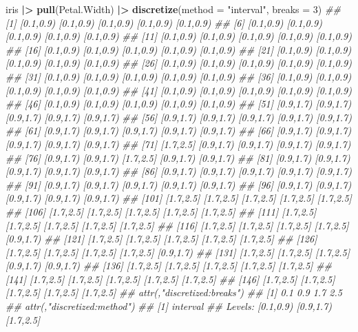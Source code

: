 \documentclass[
  notitlepage]{book}
\newenvironment{Shaded}{\begin{snugshade}}{\end{snugshade}}
\newcommand{\CommentTok}[1]{\textcolor[rgb]{0.56,0.35,0.01}{\textit{#1}}}
\newcommand{\DataTypeTok}[1]{\textcolor[rgb]{0.13,0.29,0.53}{#1}}
\newcommand{\DecValTok}[1]{\textcolor[rgb]{0.00,0.00,0.81}{#1}}
\newcommand{\ErrorTok}[1]{\textcolor[rgb]{0.64,0.00,0.00}{\textbf{#1}}}
\newcommand{\KeywordTok}[1]{\textcolor[rgb]{0.13,0.29,0.53}{\textbf{#1}}}
\newcommand{\NormalTok}[1]{#1}
\newcommand{\OperatorTok}[1]{\textcolor[rgb]{0.81,0.36,0.00}{\textbf{#1}}}
\newcommand{\StringTok}[1]{\textcolor[rgb]{0.31,0.60,0.02}{#1}}
\begin{document}
\begin{Shaded}
\begin{Highlighting}[]
\NormalTok{iris }\OperatorTok{|}\ErrorTok{\textgreater{}}\StringTok{ }\KeywordTok{pull}\NormalTok{(Petal.Width) }\OperatorTok{|}\ErrorTok{\textgreater{}}\StringTok{ }
\StringTok{  }\KeywordTok{discretize}\NormalTok{(}\DataTypeTok{method =} \StringTok{"interval"}\NormalTok{, }\DataTypeTok{breaks =} \DecValTok{3}\NormalTok{)}
\CommentTok{\#\#   [1] [0.1,0.9) [0.1,0.9) [0.1,0.9) [0.1,0.9) [0.1,0.9)}
\CommentTok{\#\#   [6] [0.1,0.9) [0.1,0.9) [0.1,0.9) [0.1,0.9) [0.1,0.9)}
\CommentTok{\#\#  [11] [0.1,0.9) [0.1,0.9) [0.1,0.9) [0.1,0.9) [0.1,0.9)}
\CommentTok{\#\#  [16] [0.1,0.9) [0.1,0.9) [0.1,0.9) [0.1,0.9) [0.1,0.9)}
\CommentTok{\#\#  [21] [0.1,0.9) [0.1,0.9) [0.1,0.9) [0.1,0.9) [0.1,0.9)}
\CommentTok{\#\#  [26] [0.1,0.9) [0.1,0.9) [0.1,0.9) [0.1,0.9) [0.1,0.9)}
\CommentTok{\#\#  [31] [0.1,0.9) [0.1,0.9) [0.1,0.9) [0.1,0.9) [0.1,0.9)}
\CommentTok{\#\#  [36] [0.1,0.9) [0.1,0.9) [0.1,0.9) [0.1,0.9) [0.1,0.9)}
\CommentTok{\#\#  [41] [0.1,0.9) [0.1,0.9) [0.1,0.9) [0.1,0.9) [0.1,0.9)}
\CommentTok{\#\#  [46] [0.1,0.9) [0.1,0.9) [0.1,0.9) [0.1,0.9) [0.1,0.9)}
\CommentTok{\#\#  [51] [0.9,1.7) [0.9,1.7) [0.9,1.7) [0.9,1.7) [0.9,1.7)}
\CommentTok{\#\#  [56] [0.9,1.7) [0.9,1.7) [0.9,1.7) [0.9,1.7) [0.9,1.7)}
\CommentTok{\#\#  [61] [0.9,1.7) [0.9,1.7) [0.9,1.7) [0.9,1.7) [0.9,1.7)}
\CommentTok{\#\#  [66] [0.9,1.7) [0.9,1.7) [0.9,1.7) [0.9,1.7) [0.9,1.7)}
\CommentTok{\#\#  [71] [1.7,2.5] [0.9,1.7) [0.9,1.7) [0.9,1.7) [0.9,1.7)}
\CommentTok{\#\#  [76] [0.9,1.7) [0.9,1.7) [1.7,2.5] [0.9,1.7) [0.9,1.7)}
\CommentTok{\#\#  [81] [0.9,1.7) [0.9,1.7) [0.9,1.7) [0.9,1.7) [0.9,1.7)}
\CommentTok{\#\#  [86] [0.9,1.7) [0.9,1.7) [0.9,1.7) [0.9,1.7) [0.9,1.7)}
\CommentTok{\#\#  [91] [0.9,1.7) [0.9,1.7) [0.9,1.7) [0.9,1.7) [0.9,1.7)}
\CommentTok{\#\#  [96] [0.9,1.7) [0.9,1.7) [0.9,1.7) [0.9,1.7) [0.9,1.7)}
\CommentTok{\#\# [101] [1.7,2.5] [1.7,2.5] [1.7,2.5] [1.7,2.5] [1.7,2.5]}
\CommentTok{\#\# [106] [1.7,2.5] [1.7,2.5] [1.7,2.5] [1.7,2.5] [1.7,2.5]}
\CommentTok{\#\# [111] [1.7,2.5] [1.7,2.5] [1.7,2.5] [1.7,2.5] [1.7,2.5]}
\CommentTok{\#\# [116] [1.7,2.5] [1.7,2.5] [1.7,2.5] [1.7,2.5] [0.9,1.7)}
\CommentTok{\#\# [121] [1.7,2.5] [1.7,2.5] [1.7,2.5] [1.7,2.5] [1.7,2.5]}
\CommentTok{\#\# [126] [1.7,2.5] [1.7,2.5] [1.7,2.5] [1.7,2.5] [0.9,1.7)}
\CommentTok{\#\# [131] [1.7,2.5] [1.7,2.5] [1.7,2.5] [0.9,1.7) [0.9,1.7)}
\CommentTok{\#\# [136] [1.7,2.5] [1.7,2.5] [1.7,2.5] [1.7,2.5] [1.7,2.5]}
\CommentTok{\#\# [141] [1.7,2.5] [1.7,2.5] [1.7,2.5] [1.7,2.5] [1.7,2.5]}
\CommentTok{\#\# [146] [1.7,2.5] [1.7,2.5] [1.7,2.5] [1.7,2.5] [1.7,2.5]}
\CommentTok{\#\# attr(,"discretized:breaks")}
\CommentTok{\#\# [1] 0.1 0.9 1.7 2.5}
\CommentTok{\#\# attr(,"discretized:method")}
\CommentTok{\#\# [1] interval}
\CommentTok{\#\# Levels: [0.1,0.9) [0.9,1.7) [1.7,2.5]}
\end{Highlighting}
\end{Shaded}
\end{document}
